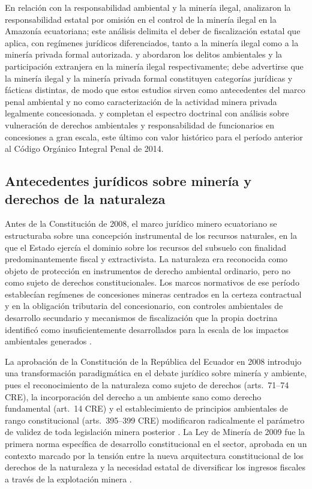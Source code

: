 En relación con la responsabilidad ambiental y la minería ilegal, \textcite{medina_garcia_2026} analizaron la responsabilidad estatal por omisión en el control de la minería ilegal en la Amazonía ecuatoriana; este análisis delimita el deber de fiscalización estatal que aplica, con regímenes jurídicos diferenciados, tanto a la minería ilegal como a la minería privada formal autorizada. \textcite{yanez_cevallos_2022} y \textcite{robalino_altamirano_2025} abordaron los delitos ambientales y la participación extranjera en la minería ilegal respectivamente; debe advertirse que la minería ilegal y la minería privada formal constituyen categorías jurídicas y fácticas distintas, de modo que estos estudios sirven como antecedentes del marco penal ambiental y no como caracterización de la actividad minera privada legalmente concesionada. \textcite{condoy_viera_2025} y \textcite{bustamante_2012} completan el espectro doctrinal con análisis sobre vulneración de derechos ambientales y responsabilidad de funcionarios en concesiones a gran escala, este último con valor histórico para el período anterior al Código Orgánico Integral Penal de 2014.

\subsection{Antecedentes jurídicos sobre minería y derechos de la naturaleza}

Antes de la Constitución de 2008, el marco jurídico minero ecuatoriano se estructuraba sobre una concepción instrumental de los recursos naturales, en la que el Estado ejercía el dominio sobre los recursos del subsuelo con finalidad predominantemente fiscal y extractivista. La naturaleza era reconocida como objeto de protección en instrumentos de derecho ambiental ordinario, pero no como sujeto de derechos constitucionales. Los marcos normativos de ese período establecían regímenes de concesiones mineras centrados en la certeza contractual y en la obligación tributaria del concesionario, con controles ambientales de desarrollo secundario y mecanismos de fiscalización que la propia doctrina identificó como insuficientemente desarrollados para la escala de los impactos ambientales generados \parencite{bustamante_2012}.

La aprobación de la Constitución de la República del Ecuador en 2008 introdujo una transformación paradigmática en el debate jurídico sobre minería y ambiente, pues el reconocimiento de la naturaleza como sujeto de derechos (arts.\ 71--74 CRE), la incorporación del derecho a un ambiente sano como derecho fundamental (art.\ 14 CRE) y el establecimiento de principios ambientales de rango constitucional (arts.\ 395--399 CRE) modificaron radicalmente el parámetro de validez de toda legislación minera posterior \parencite{cre_2008}. La Ley de Minería de 2009 fue la primera norma específica de desarrollo constitucional en el sector, aprobada en un contexto marcado por la tensión entre la nueva arquitectura constitucional de los derechos de la naturaleza y la necesidad estatal de diversificar los ingresos fiscales a través de la explotación minera \parencite{ley_mineria_2009}.

